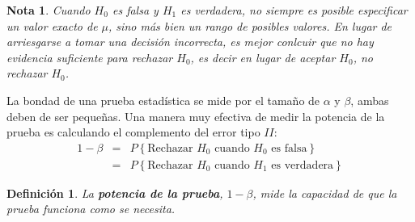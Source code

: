 \documentclass[a4paper]{report} %
\newtheorem{Def}{Definici\'on}[chapter]
\newtheorem{Note}{Nota}[chapter]
\begin{document}
\begin{Note}
Cuando $H_{0}$ es falsa y $H_{1}$ es verdadera, no siempre es posible especificar un valor exacto de $\mu$, sino m\'as bien un rango de posibles valores.\medskip
En lugar de arriesgarse a tomar una decisi\'on incorrecta, es mejor conlcuir que \textit{no hay evidencia suficiente para rechazar $H_{0}$}, es decir en lugar de aceptar $H_{0}$, \textit{no rechazar $H_{0}$}.

\end{Note}
La bondad de una prueba estad\'istica se mide por el tama\~ no de $\alpha$ y $\beta$, ambas deben de ser peque\~ nas. Una manera muy efectiva de medir la potencia de la prueba es calculando el complemento del error tipo $II$:
\begin{eqnarray*}
1-\beta&= &P\left\{\textrm{Rechazar }H_{0}\textrm{ cuando }H_{0}\textrm{ es falsa}\right\}\\
&=&P\left\{\textrm{Rechazar }H_{0}\textrm{ cuando }H_{1}\textrm{ es verdadera}\right\}
\end{eqnarray*}
\begin{Def}
La \textbf{potencia de la prueba}, $1-\beta$, mide la capacidad de que la prueba funciona como se necesita.
\end{Def}
\end{document}
